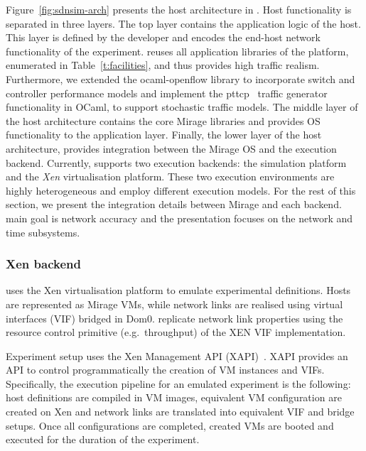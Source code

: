 Figure~\ref{fig:sdnsim-arch} presents the host architecture in \sdnsim. Host
functionality is separated in three layers.  The top layer contains the
application logic of the host. This layer is defined by the developer and
encodes the end-host network functionality of the experiment. \sdnsim reuses all
application libraries of the \mirage platform, enumerated in
Table~\ref{t:facilities}, and thus provides high traffic realism.  Furthermore,
we extended the ocaml-openflow library to incorporate switch and controller
performance models and implement the pttcp~ traffic generator
functionality in OCaml, to support stochastic traffic models.  The middle layer
of the host architecture contains the core Mirage libraries and provides OS
functionality to the application layer. Finally, the lower layer of the host
architecture, provides integration between the Mirage OS and the execution
backend.  Currently, \sdnsim supports two execution backends: the
\textit{} simulation platform  and the \textit{Xen} virtualisation
platform. These two execution environments are highly heterogeneous and employ
different execution models. For the rest of this section, we present the
integration details between Mirage and each backend.  \sdnsim main goal
is network accuracy and the presentation focuses on the network and time
subsystems.

\subsubsection{Xen backend} \label{sec:sdnsim:xen-backend}

\sdnsim uses the Xen virtualisation platform to emulate experimental
definitions. Hosts are represented as Mirage VMs, while network links are
realised using virtual interfaces (VIF) bridged in Dom0. \sdnsim replicate
network link properties using the resource control primitive (e.g.~throughput)
of the XEN VIF implementation.

Experiment setup uses the Xen Management API (XAPI)~.
XAPI provides an API to control programmatically the
creation of VM instances and VIFs. Specifically, the execution pipeline for an
emulated experiment is the following: host definitions are compiled in VM
images, equivalent VM configuration are created on Xen and network links are
translated into equivalent VIF and bridge setups. Once all configurations are
completed, created VMs are booted and executed for the duration of the experiment.

